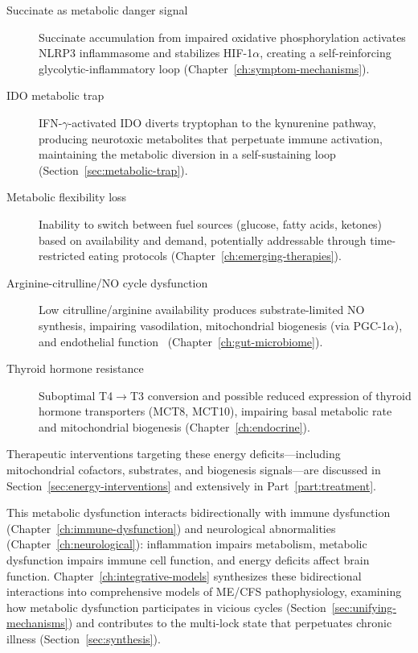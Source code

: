 \begin{description}
    \item[Succinate as metabolic danger signal] Succinate accumulation from impaired oxidative phosphorylation activates NLRP3 inflammasome and stabilizes HIF-1$\alpha$, creating a self-reinforcing glycolytic-inflammatory loop (Chapter~\ref{ch:symptom-mechanisms}).

    \item[IDO metabolic trap] IFN-$\gamma$-activated IDO diverts tryptophan to the kynurenine pathway, producing neurotoxic metabolites that perpetuate immune activation, maintaining the metabolic diversion in a self-sustaining loop (Section~\ref{sec:metabolic-trap}).

    \item[Metabolic flexibility loss] Inability to switch between fuel sources (glucose, fatty acids, ketones) based on availability and demand, potentially addressable through time-restricted eating protocols (Chapter~\ref{ch:emerging-therapies}).

    \item[Arginine-citrulline/NO cycle dysfunction] Low citrulline/arginine availability produces substrate-limited NO synthesis, impairing vasodilation, mitochondrial biogenesis (via PGC-1$\alpha$), and endothelial function~\cite{Yamano2016tca_urea} (Chapter~\ref{ch:gut-microbiome}).

    \item[Thyroid hormone resistance] Suboptimal T4$\to$T3 conversion and possible reduced expression of thyroid hormone transporters (MCT8, MCT10), impairing basal metabolic rate and mitochondrial biogenesis (Chapter~\ref{ch:endocrine}).
\end{description}

Therapeutic interventions targeting these energy deficits---including mitochondrial cofactors, substrates, and biogenesis signals---are discussed in Section~\ref{sec:energy-interventions} and extensively in Part~\ref{part:treatment}.

\medskip

This metabolic dysfunction interacts bidirectionally with immune dysfunction (Chapter~\ref{ch:immune-dysfunction}) and neurological abnormalities (Chapter~\ref{ch:neurological}): inflammation impairs metabolism, metabolic dysfunction impairs immune cell function, and energy deficits affect brain function. Chapter~\ref{ch:integrative-models} synthesizes these bidirectional interactions into comprehensive models of ME/CFS pathophysiology, examining how metabolic dysfunction participates in vicious cycles (Section~\ref{sec:unifying-mechanisms}) and contributes to the multi-lock state that perpetuates chronic illness (Section~\ref{sec:synthesis}).

